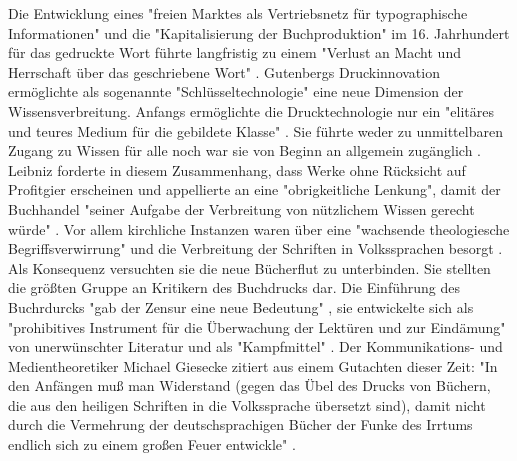 Die Entwicklung eines "freien Marktes als Vertriebsnetz für typographische Informationen"\cite{giesecke_1991_buchdruck} und die "Kapitalisierung der Buchproduktion" \cite{steiner_1998_autorenhonorar} im 16. Jahrhundert für das gedruckte Wort führte langfristig zu einem "Verlust an Macht und Herrschaft über das geschriebene Wort" \cite{wunderlich_2008_buchdruck}. Gutenbergs Druckinnovation ermöglichte als sogenannte "Schlüsseltechnologie" \cite{jager_1993_theoretische} eine neue Dimension der Wissensverbreitung. Anfangs ermöglichte die Drucktechnologie nur ein "elitäres und teures Medium für die gebildete Klasse" \cite{hartmann_2008_medien}. Sie führte weder zu unmittelbaren Zugang zu Wissen für alle noch war sie von Beginn an allgemein zugänglich \cite{hartmann_2008_medien}. Leibniz forderte in diesem Zusammenhang, dass Werke ohne Rücksicht auf Profitgier erscheinen und appellierte an eine "obrigkeitliche Lenkung", damit der Buchhandel "seiner Aufgabe der Verbreitung von nützlichem Wissen gerecht würde" \cite{wittmann_1999_geschichte}. Vor allem kirchliche Instanzen waren über eine "wachsende theologiesche Begriffsverwirrung" und die Verbreitung der Schriften in Volkssprachen besorgt \cite{giesecke_1991_buchdruck}. Als Konsequenz versuchten sie die neue Bücherflut zu unterbinden. Sie stellten die größten Gruppe an Kritikern des Buchdrucks dar\cite{giesecke_1991_buchdruck}. Die Einführung des Buchrdurcks "gab der Zensur eine neue Bedeutung" \cite{sprachgeschichte_1998_besch}, sie entwickelte sich als "prohibitives Instrument für die Überwachung der Lektüren und zur Eindämung" von unerwünschter Literatur \cite{suchen} und als "Kampfmittel" \cite{sprachgeschichte_1998_besch}. Der Kommunikations- und Medientheoretiker Michael Giesecke zitiert aus einem Gutachten dieser Zeit: "In den Anfängen muß man Widerstand (gegen das Übel des Drucks von Büchern, die aus den heiligen Schriften in die Volkssprache übersetzt sind), damit nicht durch die Vermehrung der deutschsprachigen Bücher der Funke des Irrtums endlich sich zu einem großen Feuer entwickle" \cite{giesecke_1991_buchdruck}.

